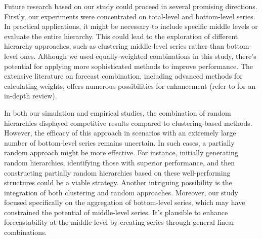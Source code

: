 \documentclass[a4paper,review,12pt,authoryear]{elsarticle}
\begin{document}
Future research based on our study could proceed in several promising directions. Firstly, our experiments were concentrated on total-level and bottom-level series. In practical applications, it might be necessary to include specific middle levels or evaluate the entire hierarchy. This could lead to the exploration of different hierarchy approaches, such as clustering middle-level series rather than bottom-level ones. Although we used equally-weighted combinations in this study, there's potential for applying more sophisticated methods to improve performance. The extensive literature on forecast combination, including advanced methods for calculating weights, offers numerous possibilities for enhancement (refer to \citealp{wangForecastCombinations50year2022} for an in-depth review).


In both our simulation and empirical studies, the combination of random hierarchies displayed competitive results compared to clustering-based methods. However, the efficacy of this approach in scenarios with an extremely large number of bottom-level series remains uncertain. In such cases, a partially random approach might be more effective. For instance, initially generating random hierarchies, identifying those with superior performance, and then constructing partially random hierarchies based on these well-performing structures could be a viable strategy. Another intriguing possibility is the integration of both clustering and random approaches. Moreover, our study focused specifically on the aggregation of bottom-level series, which may have constrained the potential of middle-level series. It's plausible to enhance forecastability at the middle level by creating series through general linear combinations. 
\end{document}
